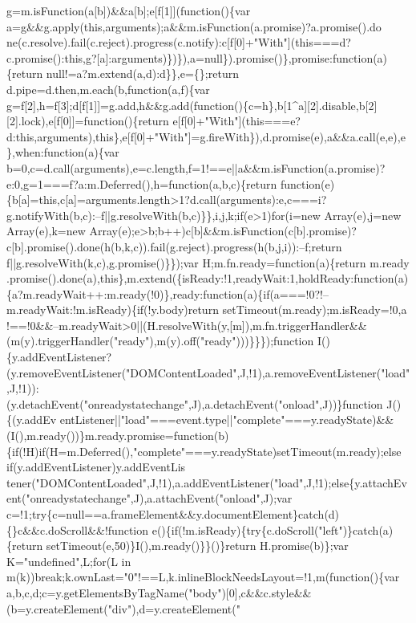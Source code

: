 \begin{DoxyCode}
{       g=m.isFunction(a[b])&&a[b];e[f[1]](function()\{var
       a=g&&g.apply(this,arguments);a&&m.isFunction(a.promise)?a.promise().do
      ne(c.resolve).fail(c.reject).progress(c.notify):c[f[0]+"With"](this===d?c.promise():this,g?[a]:arguments)\})\}),a=null\}).promise()\},promise:function(a)\{return null!=a?m.extend(a,d):d\}\},e=\{\};return
       d.pipe=d.then,m.each(b,function(a,f)\{var
       g=f[2],h=f[3];d[f[1]]=g.add,h&&g.add(function()\{c=h\},b[1^a][2].disable,b[2][2].lock),e[f[0]]=function()\{return
       e[f[0]+"With"](this===e?d:this,arguments),this\},e[f[0]+"With"]=g.fireWith\}),d.promise(e),a&&a.call(e,e),e\},when:function(a)\{var
       b=0,c=d.call(arguments),e=c.length,f=1!==e||a&&m.isFunction(a.promise)?e:0,g=1===f?a:m.Deferred(),h=function(a,b,c)\{return
       function(e)\{b[a]=this,c[a]=arguments.length>1?d.call(arguments):e,c===i?g.notifyWith(b,c):--f||g.resolveWith(b,c)\}\},i,j,k;if(e>1)for(i=new Array(e),j=new
       Array(e),k=new
       Array(e);e>b;b++)c[b]&&m.isFunction(c[b].promise)?c[b].promise().done(h(b,k,c)).fail(g.reject).progress(h(b,j,i)):--f;return f||g.resolveWith(k,c),g.promise()\}\});var H;m.fn.ready=function(a)\{return
       m.ready
      .promise().done(a),this\},m.extend(\{isReady:!1,readyWait:1,holdReady:function(a)\{a?m.readyWait++:m.ready(!0)\},ready:function(a)\{if(a===!0?!--m.readyWait:!m.isReady)\{if(!y.body)return
       setTimeout(m.ready);m.isReady=!0,a
      !==!0&&--m.readyWait>0||(H.resolveWith(y,[m]),m.fn.triggerHandler&&(m(y).triggerHandler("ready"),m(y).off("ready")))\}\}\});function
       I()\{y.addEventListener?(y.removeEventListener("DOMContentLoaded",J,!1),a.removeEventListener("load",J,!1)):(y.detachEvent("onreadystatechange",J),a.detachEvent("onload",J))\}function
       J()\{(y.addEv
      entListener||"load"===event.type||"complete"===y.readyState)&&(I(),m.ready())\}m.ready.promise=function(b)\{if(!H)if(H=m.Deferred(),"complete"===y.readyState)setTimeout(m.ready);else
       if(y.addEventListener)y.addEventLis
      tener("DOMContentLoaded",J,!1),a.addEventListener("load",J,!1);else\{y.attachEvent("onreadystatechange",J),a.attachEvent("onload",J);var
       c=!1;try\{c=null==a.frameElement&&y.documentElement\}catch(d)\{\}c&&c.doScroll&&!function e()\{if(!m.isReady)\{try\{c.doScroll("left")\}catch(a)\{return setTimeout(e,50)\}I(),m.ready()\}\}()\}return
       H.promise(b)\};var K="undefined",L;for(L in
       m(k))break;k.ownLast="0"!==L,k.inlineBlockNeedsLayout=!1,m(function()\{var
       a,b,c,d;c=y.getElementsByTagName("body")[0],c&&c.style&&(b=y.createElement("div"),d=y.createElement("
}
\end{DoxyCode}

